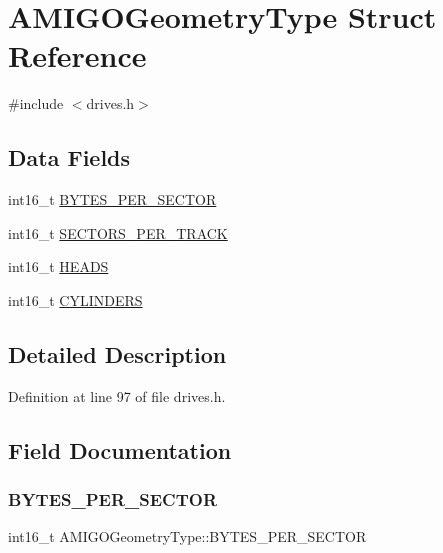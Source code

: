 \hypertarget{structAMIGOGeometryType}{}\section{A\+M\+I\+G\+O\+Geometry\+Type Struct Reference}
\label{structAMIGOGeometryType}


{\ttfamily \#include $<$drives.\+h$>$}

\subsection*{Data Fields}
\begin{DoxyCompactItemize}
\item 
int16\+\_\+t \hyperlink{structAMIGOGeometryType_a446d9194981ebd7af3c1b11cdbdf0cfd}{B\+Y\+T\+E\+S\+\_\+\+P\+E\+R\+\_\+\+S\+E\+C\+T\+OR}
\item 
int16\+\_\+t \hyperlink{structAMIGOGeometryType_ac19c5a32ffb2f05ebb00c64cac0903ee}{S\+E\+C\+T\+O\+R\+S\+\_\+\+P\+E\+R\+\_\+\+T\+R\+A\+CK}
\item 
int16\+\_\+t \hyperlink{structAMIGOGeometryType_a0c058525ff9c043708a0773eec513dbf}{H\+E\+A\+DS}
\item 
int16\+\_\+t \hyperlink{structAMIGOGeometryType_a5a0d5f6611aeb7db58ff4a851bde8fcf}{C\+Y\+L\+I\+N\+D\+E\+RS}
\end{DoxyCompactItemize}


\subsection{Detailed Description}


Definition at line 97 of file drives.\+h.



\subsection{Field Documentation}
\mbox{\label{structAMIGOGeometryType_a446d9194981ebd7af3c1b11cdbdf0cfd}} 
\subsubsection{\texorpdfstring{B\+Y\+T\+E\+S\+\_\+\+P\+E\+R\+\_\+\+S\+E\+C\+T\+OR}{BYTES\_PER\_SECTOR}}
{\footnotesize\ttfamily int16\+\_\+t A\+M\+I\+G\+O\+Geometry\+Type\+::\+B\+Y\+T\+E\+S\+\_\+\+P\+E\+R\+\_\+\+S\+E\+C\+T\+OR}



